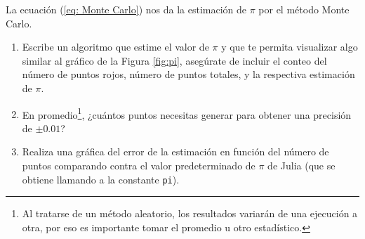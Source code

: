 \documentclass[a4paper]{article}
\begin{document}
\noindent La ecuación (\ref{eq: Monte Carlo}) nos da la estimación de $\pi$ por el método Monte Carlo.

\begin{enumerate}
    \item Escribe un algoritmo que estime el valor de $\pi$ y que te permita visualizar algo similar al gráfico de la Figura \ref{fig:pi}, asegúrate de incluir el conteo del número de puntos rojos, número de puntos totales, y la respectiva estimación de $\pi$.
    \item En promedio\footnote{Al tratarse de un método aleatorio, los resultados variarán de una ejecución a otra, por eso es importante tomar el promedio u otro estadístico.}, ¿cuántos puntos necesitas generar para obtener una precisión de $\pm 0.01$? 
    \item Realiza una gráfica del error de la estimación en función del número de puntos comparando contra el valor predeterminado de $\pi$ de Julia (que se obtiene llamando a la constante \texttt{pi}).
\end{enumerate}
\end{document}
